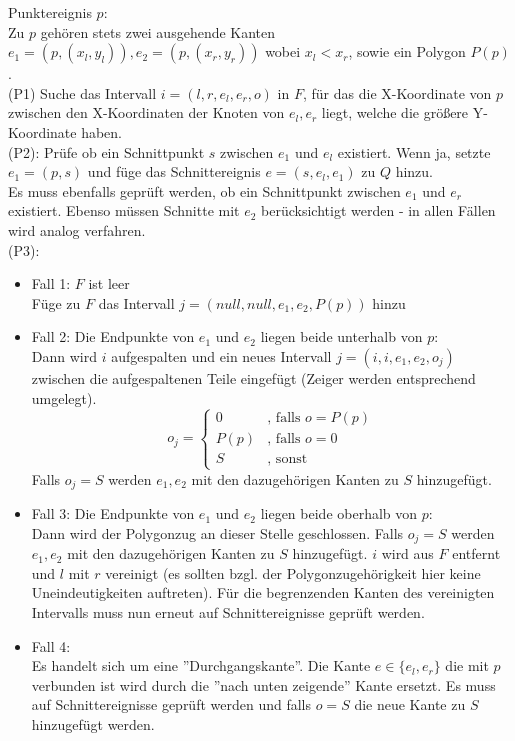 Punktereignis $p$:\\
Zu $p$ gehören stets zwei ausgehende Kanten $e_1=(p,(x_l,y_l)),e_2=(p,(x_r,y_r))$ wobei $x_l<x_r$, sowie ein Polygon $P(p)$.\\
(P1) Suche das Intervall $i=(l,r,e_l,e_r,o)$ in $F$, für das die X-Koordinate von $p$ zwischen den X-Koordinaten der Knoten von $e_l,e_r$ liegt, welche die größere Y-Koordinate haben.\\
(P2): Prüfe ob ein Schnittpunkt $s$ zwischen $e_1$ und $e_l$ existiert. Wenn ja, setzte $e_1=(p,s)$ und füge das Schnittereignis $e=(s,e_l,e_1)$ zu $Q$ hinzu.\\
Es muss ebenfalls geprüft werden, ob ein Schnittpunkt zwischen $e_1$ und $e_r$ existiert. Ebenso müssen Schnitte mit $e_2$ berücksichtigt werden - in allen Fällen wird analog verfahren.\\
(P3):
\begin{itemize}
\item Fall 1: $F$ ist leer\\
Füge zu $F$ das Intervall $j=(null,null,e_1,e_2,P(p))$ hinzu
\item Fall 2: Die Endpunkte von $e_1$ und $e_2$ liegen beide unterhalb von $p$:\\
Dann wird $i$ aufgespalten und ein neues Intervall $j=(i,i,e_1,e_2,o_j)$ zwischen die aufgespaltenen Teile eingefügt (Zeiger werden entsprechend umgelegt).
$$o_j=\begin{cases}
0&\text{, falls }o=P(p)\\
P(p)&\text{, falls }o=0\\
S&\text{, sonst} 
\end{cases}$$
Falls $o_j=S$ werden $e_1,e_2$ mit den dazugehörigen Kanten zu $S$ hinzugefügt.
\item Fall 3: Die Endpunkte von $e_1$ und $e_2$ liegen beide oberhalb von $p$:\\
Dann wird der Polygonzug an dieser Stelle geschlossen. Falls $o_j=S$ werden $e_1,e_2$ mit den dazugehörigen Kanten zu $S$ hinzugefügt. $i$ wird aus $F$ entfernt und $l$ mit $r$ vereinigt (es sollten bzgl. der Polygonzugehörigkeit hier keine Uneindeutigkeiten auftreten). Für die begrenzenden Kanten des vereinigten Intervalls muss nun erneut auf Schnittereignisse geprüft werden.
\item Fall 4:\\
Es handelt sich um eine ''Durchgangskante''. Die Kante $e\in\{ e_l,e_r\}$ die mit $p$ verbunden ist wird durch die ''nach unten zeigende'' Kante ersetzt. Es muss auf Schnittereignisse geprüft werden und falls $o=S$ die neue Kante zu $S$ hinzugefügt werden.
\end{itemize}

